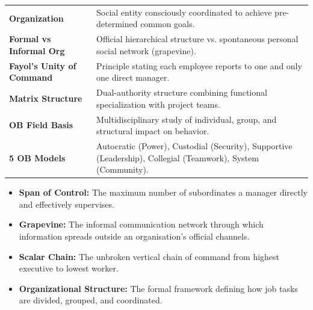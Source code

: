 \documentclass[12pt,a4paper]{article}
\renewcommand{\arraystretch}{1.45}
\begin{document}
\begin{tcolorbox}[formulabox, title={\textbf{Key Concepts and Metrics at a Glance}}]
\renewcommand{\arraystretch}{1.35}
\begin{tabularx}{\linewidth}{>{\raggedright\arraybackslash\bfseries}p{4.5cm} X}
Organization & Social entity consciously coordinated to achieve pre-determined common goals. \\[4pt]
Formal vs Informal Org & Official hierarchical structure vs. spontaneous personal social network (grapevine). \\[4pt]
Fayol's Unity of Command & Principle stating each employee reports to one and only one direct manager. \\[4pt]
Matrix Structure & Dual-authority structure combining functional specialization with project teams. \\[4pt]
OB Field Basis & Multidisciplinary study of individual, group, and structural impact on behavior. \\[4pt]
5 OB Models & Autocratic (Power), Custodial (Security), Supportive (Leadership), Collegial (Teamwork), System (Community). \\
\end{tabularx}
\end{tcolorbox}

\begin{tcolorbox}[defbox, title={\textbf{One-Line Definitions for Exam Revision}}]
  \begin{itemize}[leftmargin=*, itemsep=2pt]
    \item \textbf{Span of Control:} The maximum number of subordinates a manager directly and effectively supervises.
    \item \textbf{Grapevine:} The informal communication network through which information spreads outside an organisation's official channels.
    \item \textbf{Scalar Chain:} The unbroken vertical chain of command from highest executive to lowest worker.
    \item \textbf{Organizational Structure:} The formal framework defining how job tasks are divided, grouped, and coordinated.
  \end{itemize}
\end{tcolorbox}
\end{document}
